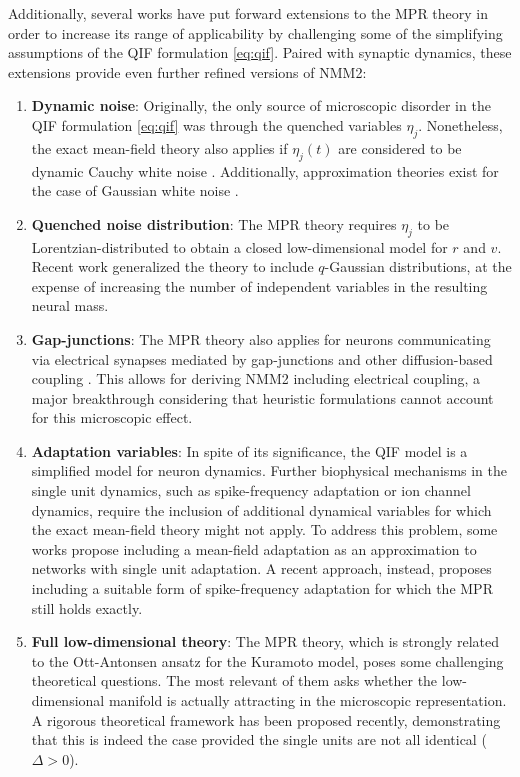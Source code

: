 \documentclass[12pt]{article}
\numberwithin{equation}{section}
\begin{document}
Additionally,
several works have put forward extensions to the MPR theory in order to increase its range
of applicability by challenging some of the simplifying assumptions of the QIF formulation \eqref{eq:qif}.
Paired with synaptic dynamics, these extensions provide even further refined versions of NMM2:

\begin{enumerate}
    \item \textbf{Dynamic noise}: Originally, the only source of microscopic disorder in the QIF formulation \eqref{eq:qif} was through the quenched variables $\eta_j$.
    Nonetheless, the exact mean-field theory also applies if $\eta_j(t)$ are considered to be
    dynamic Cauchy white noise \cite{clusella2024}. Additionally, approximation theories exist for the case of Gaussian white noise \cite{Goldobin2021,Goldobin2021_2}.
    \item \textbf{Quenched noise distribution}: The MPR theory requires $\eta_j$ to be Lorentzian-distributed to obtain a closed low-dimensional model for $r$ and $v$.
    Recent work generalized the theory to include $q$-Gaussian distributions, at the expense of
    increasing the number of independent variables in the resulting neural mass\cite{PP22,PP24}. 
    \item \textbf{Gap-junctions}: The MPR theory also applies for neurons communicating via electrical synapses mediated by gap-junctions and other diffusion-based coupling \cite{Pietras2019,Montbrio:2020aa}. This allows for deriving NMM2 including electrical coupling, a major breakthrough considering that heuristic formulations cannot account for this microscopic effect. 
    \item \textbf{Adaptation variables}: In spite of its significance, the QIF model is a simplified model for neuron dynamics. Further biophysical mechanisms in the single unit dynamics, such as spike-frequency adaptation or ion channel dynamics, require the inclusion of additional dynamical variables for which the exact mean-field theory might not apply.
    To address this problem, some works propose including a mean-field adaptation as an approximation to networks with single unit adaptation\cite{chenExactMeanfieldModels2022,ferraraPopulationSpikingBursting2023}. 
    A recent approach, instead, proposes including a suitable form of spike-frequency adaptation for which the MPR still holds exactly\cite{Pietras2025}. 
    \item \textbf{Full low-dimensional theory}: The MPR theory, which is strongly related to the Ott-Antonsen ansatz for the Kuramoto model\cite{Ott2008}, poses some challenging theoretical questions. The most relevant of them asks whether the low-dimensional manifold is actually attracting in the microscopic representation. A rigorous theoretical framework has been proposed recently, demonstrating that this is indeed the case provided the single units are not all identical ($\Delta>0$)\cite{Pietras2023}. 
\end{enumerate}
\end{document}
